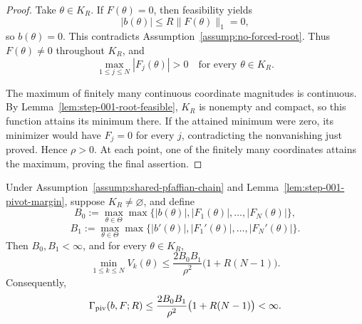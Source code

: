 \begin{proof}
Take $\theta\in K_R$.  If $F(\theta)=0$, then feasibility yields
\[
|b(\theta)|\leq R\|F(\theta)\|_1=0,
\]
so $b(\theta)=0$.  This contradicts
Assumption~\ref{assump:no-forced-root}.  Thus $F(\theta)\neq0$ throughout
$K_R$, and
\[
\max_{1\leq j\leq N}|F_j(\theta)|>0
\quad\text{for every }\theta\in K_R.
\]

The maximum of finitely many continuous coordinate magnitudes is continuous.
By Lemma~\ref{lem:step-001-root-feasible}, $K_R$ is nonempty and compact, so
this function attains its minimum there.  If the attained minimum were zero,
its minimizer would have $F_j=0$ for every $j$, contradicting the
nonvanishing just proved.  Hence $\rho>0$.  At each point, one of the
finitely many coordinates attains the maximum, proving the final assertion.
\end{proof}

\begin{proposition}
\label{prop:step-001-fixed-family-bound}
Under Assumption~\ref{assump:shared-pfaffian-chain} and
Lemma~\ref{lem:step-001-pivot-margin}, suppose $K_R\neq\varnothing$, and
define
\[
B_0:=\max_{\theta\in\Theta}
\max\{|b(\theta)|,|F_1(\theta)|,\ldots,|F_N(\theta)|\},
\]
\[
B_1:=\max_{\theta\in\Theta}
\max\{|b'(\theta)|,|F_1'(\theta)|,\ldots,|F_N'(\theta)|\}.
\]
Then $B_0,B_1<\infty$, and for every $\theta\in K_R$,
\[
\min_{1\leq k\leq N}V_k(\theta)
\leq
\frac{2B_0B_1}{\rho^2}\bigl(1+R(N-1)\bigr).
\]
Consequently,
\[
\Gamma_{\rm piv}(b,F;R)
\leq
\frac{2B_0B_1}{\rho^2}\bigl(1+R(N-1)\bigr)<\infty.
\]
\end{proposition}

